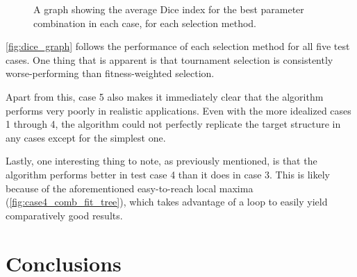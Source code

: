 \documentclass{report}
\begin{document}
\begin{figure}[ht]
    \centering
    \caption{A graph showing the average Dice index for the best parameter combination in each case, for each selection method.}
    \label{fig:dice_graph}
\end{figure}

\autoref{fig:dice_graph} follows the performance of each selection method for all five test cases. One thing that is apparent is that tournament selection is consistently worse-performing than fitness-weighted selection.

Apart from this, case 5 also makes it immediately clear that the algorithm performs very poorly in realistic applications. Even with the more idealized cases 1 through 4, the algorithm could not perfectly replicate the target structure in any cases except for the simplest one.

Lastly, one interesting thing to note, as previously mentioned, is that the algorithm performs better in test case 4 than it does in case 3. This is likely because of the aforementioned easy-to-reach local maxima (\autoref{fig:case4_comb_fit_tree}), which takes advantage of a loop to easily yield comparatively good results.

\chapter{Conclusions}



\end{document}
